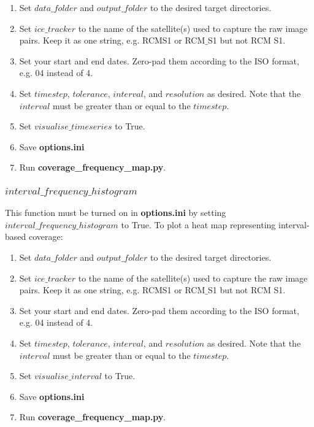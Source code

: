 \documentclass[12pt]{article}
\begin{document}
\begin{enumerate}
    \item Set $data\_folder$ and $output\_folder$ to the desired target directories.
    \item Set $ice\_tracker$ to the name of the satellite(s) used to capture the raw image pairs. Keep it as one string, e.g. RCMS1 or RCM$\_$S1 but not RCM S1.
    \item Set your start and end dates. Zero-pad them according to the ISO format, e.g. 04 instead of 4.
    \item Set $timestep$, $tolerance$, $interval$, and $resolution$ as desired. Note that the $interval$ must be greater than or equal to the $timestep$.
    \item Set $visualise\_timeseries$ to True.
    \item Save \textbf{options.ini}
    \item Run \textbf{coverage\_frequency\_map.py}.
\end{enumerate}

\subsubsection*{$interval\_frequency\_histogram$}

This function must be turned on in \textbf{options.ini} by setting $interval\_frequency\_histogram$ to True. To plot a heat map representing interval-based coverage:

\begin{enumerate}
    \item Set $data\_folder$ and $output\_folder$ to the desired target directories.
    \item Set $ice\_tracker$ to the name of the satellite(s) used to capture the raw image pairs. Keep it as one string, e.g. RCMS1 or RCM$\_$S1 but not RCM S1.
    \item Set your start and end dates. Zero-pad them according to the ISO format, e.g. 04 instead of 4.
    \item Set $timestep$, $tolerance$, $interval$, and $resolution$ as desired. Note that the $interval$ must be greater than or equal to the $timestep$.
    \item Set $visualise\_interval$ to True.
    \item Save \textbf{options.ini}
    \item Run \textbf{coverage\_frequency\_map.py}.
\end{enumerate}
\end{document}
